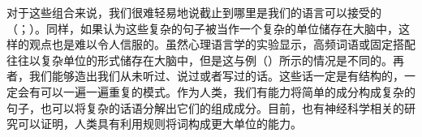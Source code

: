 对于这些组合来说，我们很难轻易地说截止到哪里是我们的语言可以接受的（\citealp[]{Harris57a}；\citealp[]{Chomsky57a}）。同样，如果认为这些复杂的句子被当作一个复杂的单位储存在大脑中，这样的观点也是难以令人信服的。虽然心理语言学的实验显示，高频词语或固定搭配往往以复杂单位的形式储存在大脑中，但是这与例（）所示的情况是不同的。再者，我们能够造出我们从未听过、说过或者写过的话。这些话一定是有结构的，一定会有可以一遍一遍重复的模式。作为人类，我们有能力将简单的成分构成复杂的句子，也可以将复杂的话语分解出它们的组成成分。目前，也有神经科学相关的研究可以证明，人类具有利用规则将词构成更大单位的能力。\citep[]{Pulvermueller2010a}

